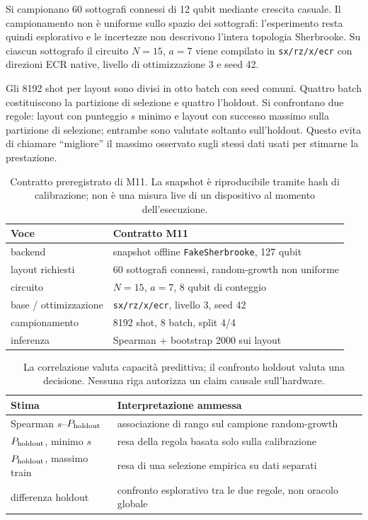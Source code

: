 \begin{onehalfspace}
Si campionano 60 sottografi connessi di 12 qubit mediante crescita casuale. Il campionamento non \`e uniforme sullo spazio dei sottografi: l'esperimento resta quindi esplorativo e le incertezze non descrivono l'intera topologia Sherbrooke. Su ciascun sottografo il circuito $N=15$, $a=7$ viene compilato in \texttt{sx/rz/x/ecr} con direzioni ECR native, livello di ottimizzazione 3 e seed 42.

Gli 8192 shot per layout sono divisi in otto batch con seed comuni. Quattro batch costituiscono la partizione di selezione e quattro l'holdout. Si confrontano due regole: layout con punteggio $s$ minimo e layout con successo massimo sulla partizione di selezione; entrambe sono valutate soltanto sull'holdout. Questo evita di chiamare ``migliore'' il massimo osservato sugli stessi dati usati per stimarne la prestazione.

\begin{table}[H]
\centering
\small
\begin{tabular}{ll}
\toprule
\textbf{Voce} & \textbf{Contratto M11} \\
\midrule
backend & snapshot offline \texttt{FakeSherbrooke}, 127 qubit \\
layout richiesti & 60 sottografi connessi, random-growth non uniforme \\
circuito & $N=15$, $a=7$, 8 qubit di conteggio \\
base / ottimizzazione & \texttt{sx/rz/x/ecr}, livello 3, seed 42 \\
campionamento & 8192 shot, 8 batch, split 4/4 \\
inferenza & Spearman + bootstrap 2000 sui layout \\
\bottomrule
\end{tabular}
\caption[Disegno del pilota sui layout]{Contratto preregistrato di M11. La snapshot \`e riproducibile tramite hash di calibrazione; non \`e una misura live di un dispositivo al momento dell'esecuzione.}
\label{tab:app_comp_pilota}
\end{table}

\begin{table}[H]
\centering
\small
\begin{tabular}{p{}p{}}
\toprule
\textbf{Stima} & \textbf{Interpretazione ammessa} \\
\midrule
Spearman $s$--$P_{\rm holdout}$ & associazione di rango sul campione random-growth \\
$P_{\rm holdout}$, minimo $s$ & resa della regola basata solo sulla calibrazione \\
$P_{\rm holdout}$, massimo train & resa di una selezione empirica su dati separati \\
differenza holdout & confronto esplorativo tra le due regole, non oracolo globale \\
\bottomrule
\end{tabular}
\caption[Stimandi del pilota M11]{La correlazione valuta capacit\`a predittiva; il confronto holdout valuta una decisione. Nessuna riga autorizza un claim causale sull'hardware.}
\label{tab:app_comp_predittori}
\end{table}


\end{onehalfspace}
